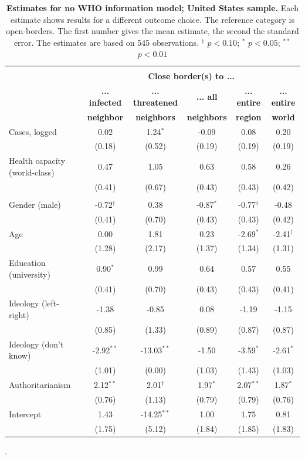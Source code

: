\begin{table}[ht!]
\begin{center}
\footnotesize
\renewcommand{\arraystretch}{1.05}
\begin{tabular}{@{\extracolsep{4.8pt}}lccccc} 
\\[-1.8ex]\hline \\[-1.8ex]
 & \multicolumn{5}{c}{\normalsize{\textbf{Close border(s) to ...}}}
\\
  & \small{\textbf{... infected}} & \small{\textbf{... threatened}} & \small{\textbf{... all}} & \small{\textbf{... entire }} & \small{\textbf{... entire}}
 \\
  & \small{\textbf{neighbor}} & \small{\textbf{neighbors}} & \small{\textbf{neighbors}} & \small{\textbf{region}} & \small{\textbf{world}}
 \\
\hline
Cases, logged & 0.02 & 1.24$^{*}$ & -0.09 & 0.08 & 0.20\\
 & (0.18) & (0.52) & (0.19) & (0.19) & (0.19)\\
Health capacity (world-class) & 0.47 & 1.05 & 0.63 & 0.58 & 0.26\\
 & (0.41) & (0.67) & (0.43) & (0.43) & (0.42)\\
\\
Gender (male) & -0.72$^{\dag}$ & 0.38 & -0.87$^{*}$ & -0.77$^{\dag}$ & -0.48\\
 & (0.41) & (0.70) & (0.43) & (0.43) & (0.42)\\
Age & 0.00 & 1.81 & 0.23 & -2.69$^{*}$ & -2.41$^{\dag}$\\
 & (1.28) & (2.17) & (1.37) & (1.34) & (1.31)\\
Education (university) & 0.90$^{*}$ & 0.99 & 0.64 & 0.57 & 0.55\\
 & (0.41) & (0.70) & (0.43) & (0.43) & (0.41)\\
Ideology (left-right) & -1.38 & -0.85 & 0.08 & -1.19 & -1.15\\
 & (0.85) & (1.33) & (0.89) & (0.87) & (0.87)\\
Ideology (don't know) & -2.92$^{**}$ & -13.03$^{**}$ & -1.50 & -3.59$^{*}$ & -2.61$^{*}$\\
 & (1.01) & (0.00) & (1.03) & (1.43) & (1.03)\\
Authoritarianism & 2.12$^{**}$ & 2.01$^{\dag}$ & 1.97$^{*}$ & 2.07$^{**}$ & 1.87$^{*}$\\
 & (0.76) & (1.13) & (0.79) & (0.79) & (0.76)\\
Intercept & 1.43 & -14.25$^{**}$ & 1.00 & 1.75 & 0.81\\
 & (1.75) & (5.12) & (1.84) & (1.85) & (1.83)\\
\hline
\hline
\end{tabular}
\caption{\textbf{Estimates for no WHO information model; United States sample.} Each estimate shows results for a different outcome choice. The reference category is open-borders. The first number gives the mean estimate, 
                the second the standard error. The estimates are based on 545 observations. $^{\dag}$ $p < 0.10$; $^{*}$ $p < 0.05$; $^{**}$ $p < 0.01$}.
\label{Tab:MainUS_2}
\end{center}
\end{table}

